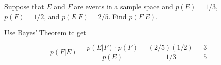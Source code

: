 \documentclass[../main.tex]{subfiles}
\begin{document}
Suppose that $E$ and $F$ are events in a sample space and $p(E) = 1/3$, $p(F) = 1/2$, and $p(E|F) = 2/5$. Find $p(F|E)$.

\solution

Use Bayes' Theorem to get

\[ p(F|E) = \frac{p(E|F)\cdot p(F)}{p(E)} = \frac{(2/5)(1/2)}{1/3} = \frac{3}{5} \]
\end{document}

